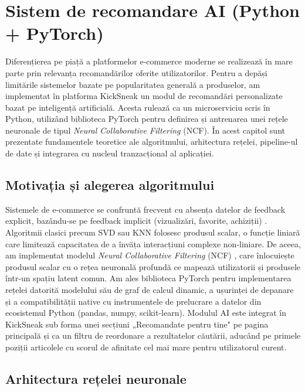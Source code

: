\chapter{Sistem de recomandare AI (Python + PyTorch)}

Diferențierea pe piață a platformelor e-commerce moderne se realizează în mare parte prin relevanța recomandărilor oferite utilizatorilor. Pentru a depăși limitările sistemelor bazate pe popularitatea generală a produselor, am implementat în platforma KickSneak un modul de recomandări personalizate bazat pe inteligență artificială. Acesta rulează ca un microserviciu scris în Python, utilizând biblioteca PyTorch pentru definirea și antrenarea unei rețele neuronale de tipul \textit{Neural Collaborative Filtering} (NCF). În acest capitol sunt prezentate fundamentele teoretice ale algoritmului, arhitectura rețelei, pipeline-ul de date și integrarea cu nucleul tranzacțional al aplicației.

\section{Motivația și alegerea algoritmului}

Sistemele de e-commerce se confruntă frecvent cu absența datelor de feedback explicit, bazându-se pe feedback implicit (vizualizări, favorite, achiziții) \cite{implicit2008hu}. Algoritmii clasici precum SVD sau KNN folosesc produsul scalar, o funcție liniară care limitează capacitatea de a învăța interacțiuni complexe non-liniare. De aceea, am implementat modelul \textit{Neural Collaborative Filtering} (NCF) \cite{he2017ncf}, care înlocuiește produsul scalar cu o rețea neuronală profundă ce mapează utilizatorii și produsele într-un spațiu latent comun. Am ales biblioteca PyTorch pentru implementarea rețelei datorită modelului său de graf de calcul dinamic, a ușurinței de depanare și a compatibilității native cu instrumentele de prelucrare a datelor din ecosistemul Python (pandas, numpy, scikit-learn). Modulul AI este integrat în KickSneak sub forma unei secțiuni „Recomandate pentru tine" pe pagina principală și ca un filtru de reordonare a rezultatelor căutării, aducând pe primele poziții articolele cu scorul de afinitate cel mai mare pentru utilizatorul curent.

\section{Arhitectura rețelei neuronale}

